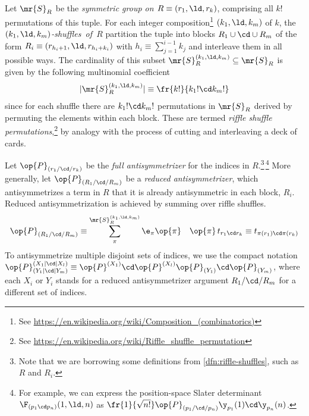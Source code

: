 \newpage
\begin{dfn}\label{dfn:riffle-shuffles}
Let $\mr{S}_R$ be the \textit{symmetric group on $R\equiv(r_1,\ld,r_k)$}, comprising all $k!$ permutations of this tuple.
For each integer composition\footnote{See \url{https://en.wikipedia.org/wiki/Composition_(combinatorics)}} $(k_1,\ld,k_m)$ of $k$, the \textit{$(k_1,\ld,k_m)$-shuffles~of~$R$} partition the tuple into blocks $R_1\cup\cd\cup R_m$ of the form $R_i\equiv(r_{h_i+1},\ld,r_{h_i+k_i})$ with $h_i\equiv\sum_{j=1}^{i-1}k_j$ and interleave them in all possible ways.
The cardinality of this subset $\mr{S}_R^{(k_1,\ld,k_m)}\subseteq \mr{S}_R$ is given by the following multinomial coefficient
\begin{align}
  |\mr{S}_R^{(k_1,\ld,k_m)}|
\equiv
  \fr{k!}{k_1!\cd k_m!}
\end{align}
since for each shuffle there are $k_1!\cd k_m!$ permutations in $\mr{S}_R$ derived by permuting the elements within each block.
These are termed \textit{riffle shuffle permutations},\footnote{See \url{https://en.wikipedia.org/wiki/Riffle_shuffle_permutation}} by analogy with the process of cutting and interleaving a deck of cards.
\end{dfn}

\begin{dfn}
Let $\op{P}_{(r_1/\cd/r_k)}$ be the \textit{full antisymmetrizer} for the indices in $R$.\footnote{Note that we are borrowing some definitions from \cref{dfn:riffle-shuffles}, such as $R$ and $R_i$.}\,\footnote{For example, we can express the position-space Slater determinant $\F_{(p_1\cd p_n)}(1,\ld,n)$ as $\fr{1}{\sqrt{n!}}\op{P}_{(p_1/\cd/p_n)}\y_{p_1}(1)\cd \y_{p_n}(n)$.}
More generally, let $\op{P}_{(R_1/\cd/R_m)}$ be a \textit{reduced antisymmetrizer}, which antisymmetrizes a term in $R$ that it is already antisymmetric in each block, $R_i$.
Reduced antisymmetrization is achieved by summing over riffle shuffles.
\begin{align}
  \op{P}_{(R_1/\cd/R_m)}
\equiv
  \sum_\pi^{\mr{S}_R^{(k_1,\ld,k_m)}}
  \e_\pi
  \op{\pi}
&&
  \op{\pi}\,
  t_{r_1\cd r_k}
\equiv
  t_{\pi(r_1)\cd \pi(r_k)}
\end{align}
To antisymmetrize multiple disjoint sets of indices, we use the compact notation
$
  \op{P}^{(X_1|\cd|X_l)}_{(Y_1|\cd|Y_m)}
\equiv
  \op{P}^{(X_1)}\cd \op{P}^{(X_l)}
  \op{P}_{(Y_1)}\cd \op{P}_{(Y_m)}
$,
where each $X_i$ or $Y_i$ stands for a reduced antisymmetrizer argument $R_1/\cd/R_m$ for a different set of indices.
\end{dfn}

